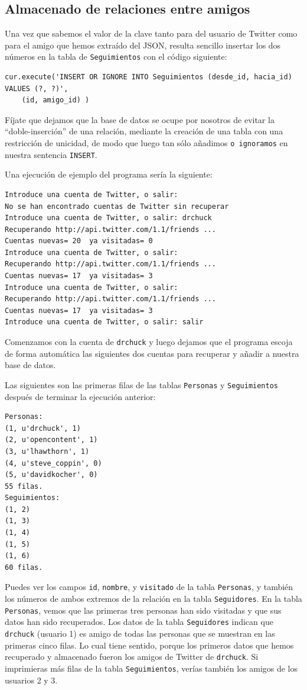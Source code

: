 \subsection{Almacenado de relaciones entre amigos}

Una vez que sabemos el valor de la clave tanto para del usuario de Twitter
como para el amigo que hemos extraído del JSON, resulta sencillo insertar
los dos números en la tabla de {\tt Seguimientos}
con el código siguiente:

\beforeverb
\begin{verbatim}
cur.execute('INSERT OR IGNORE INTO Seguimientos (desde_id, hacia_id) VALUES (?, ?)',
    (id, amigo_id) )
\end{verbatim}
\afterverb
%
Fíjate que dejamos que la base de datos se ocupe por nosotros de evitar la ``doble-inserción''
de una relación, mediante la creación de una tabla con una restricción de unicidad, de modo que
luego tan sólo añadimos {\tt o ignoramos} en nuestra sentencia {\tt INSERT}.

Una ejecución de ejemplo del programa sería la siguiente:

\beforeverb
\begin{verbatim}
Introduce una cuenta de Twitter, o salir:
No se han encontrado cuentas de Twitter sin recuperar
Introduce una cuenta de Twitter, o salir: drchuck
Recuperando http://api.twitter.com/1.1/friends ...
Cuentas nuevas= 20  ya visitadas= 0
Introduce una cuenta de Twitter, o salir: 
Recuperando http://api.twitter.com/1.1/friends ...
Cuentas nuevas= 17  ya visitadas= 3
Introduce una cuenta de Twitter, o salir:
Recuperando http://api.twitter.com/1.1/friends ...
Cuentas nuevas= 17  ya visitadas= 3
Introduce una cuenta de Twitter, o salir: salir
\end{verbatim}
\afterverb
%
Comenzamos con la cuenta de {\tt drchuck} y luego dejamos que el programa
escoja de forma automática las siguientes dos cuentas para recuperar y añadir
a nuestra base de datos.

Las siguientes son las primeras filas de las tablas {\tt Personas}
y {\tt Seguimientos} después de terminar la ejecución anterior:

\beforeverb
\begin{verbatim}
Personas:
(1, u'drchuck', 1)
(2, u'opencontent', 1)
(3, u'lhawthorn', 1)
(4, u'steve_coppin', 0)
(5, u'davidkocher', 0)
55 filas.
Seguimientos:
(1, 2)
(1, 3)
(1, 4)
(1, 5)
(1, 6)
60 filas.
\end{verbatim}
\afterverb
%
Puedes ver los campos {\tt id}, {\tt nombre}, y {\tt visitado} de la
tabla {\tt Personas}, y también los números de ambos extremos
de la relación en la tabla {\tt Seguidores}.
En la tabla {\tt Personas}, vemos que las primeras tres personas
han sido visitadas y que sus datos han sido recuperados.
Los datos de la tabla {\tt Seguidores} indican que
{\tt drchuck} (usuario 1) es amigo de todas las personas que se muestran en las primeras
cinco filas. Lo cual tiene sentido, porque
los primeros datos que hemos recuperado y almacenado fueron los amigos de Twitter de
{\tt drchuck}. Si imprimieras más filas de la tabla {\tt Seguimientos},
verías también los amigos de los usuarios 2 y 3.

